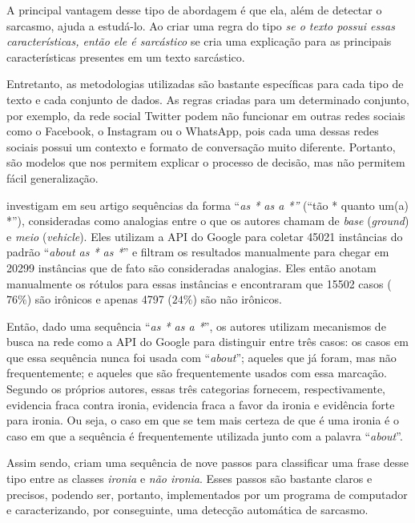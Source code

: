 A principal vantagem desse tipo de abordagem é que ela, além de detectar o
sarcasmo, ajuda a estudá-lo. Ao criar uma regra do tipo \textit{se o texto
possui essas características, então ele é sarcástico} se cria uma explicação
para as principais características presentes em um texto sarcástico.

Entretanto, as metodologias utilizadas são bastante específicas para cada tipo
de texto e cada conjunto de dados. As regras criadas para um determinado
conjunto, por exemplo, da rede social Twitter podem não funcionar em outras
redes sociais como o Facebook, o Instagram ou o WhatsApp, pois cada uma dessas
redes sociais possui um contexto e formato de conversação muito diferente.
Portanto, são modelos que nos permitem explicar o processo de decisão, mas não
permitem fácil generalização.

\cite{veale:2010} investigam em seu artigo sequências da forma ``\textit{as * as
a *''} (``tão * quanto um(a) *''), consideradas como analogias entre o que os
autores chamam de \textit{base} (\textit{ground}) e \textit{meio}
(\textit{vehicle}). Eles utilizam a API do Google para coletar 45021 instâncias
do padrão ``\textit{about as * as *}'' e filtram os resultados manualmente para
chegar em 20299 instâncias que de fato são consideradas analogias. Eles então
anotam manualmente os rótulos para essas instâncias e encontraram que 15502
casos ($76\%$) são irônicos e apenas 4797 ($24\%$) são não irônicos.

Então, dado uma sequência ``\textit{as * as a *}'', os autores utilizam
mecanismos de busca na rede como a API do Google para distinguir entre três
casos: os casos em que essa sequência nunca foi usada com ``\textit{about}'';
aqueles que já foram, mas não frequentemente; e aqueles que são frequentemente
usados com essa marcação. Segundo os próprios autores, essas três categorias
fornecem, respectivamente, evidencia fraca contra ironia, evidencia fraca a
favor da ironia e evidência forte para ironia. Ou seja, o caso em que se tem
mais certeza de que é uma ironia é o caso em que a sequência é frequentemente
utilizada junto com a palavra ``\textit{about}''.

Assim sendo, \cite{veale:2010} criam uma sequência de nove passos para
classificar uma frase desse tipo entre as classes \textit{ironia} e \textit{não
ironia}. Esses passos são bastante claros e precisos, podendo ser, portanto,
implementados por um programa de computador e caracterizando, por conseguinte,
uma detecção automática de sarcasmo.

